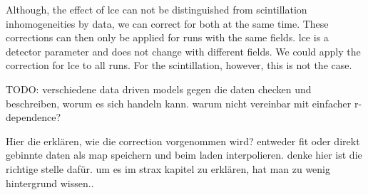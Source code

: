 Although, the effect of \gls{lce} can not be distinguished from scintillation inhomogeneities by data, we can correct for both at the same time.
These corrections can then only be applied for runs with the same fields.
\gls{lce} is a detector parameter and does not change with different fields.
We could apply the correction for \gls{lce} to all runs.
For the scintillation, however, this is not the case.



TODO: verschiedene data driven models gegen die daten checken und beschreiben, worum es sich handeln kann. warum nicht vereinbar mit einfacher r-dependence?





Hier die erklären, wie die correction vorgenommen wird? entweder fit oder direkt gebinnte daten als map speichern und beim laden interpolieren. denke hier ist die richtige stelle dafür. um es im strax kapitel zu erklären, hat man zu wenig hintergrund wissen..


